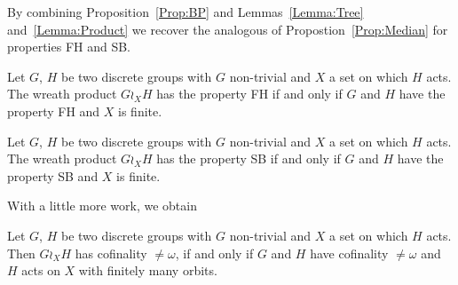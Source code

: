 By combining Proposition~\ref{Prop:BP} and Lemmas~\ref{Lemma:Tree} and~\ref{Lemma:Product} we recover the analogous of Propostion~\ref{Prop:Median} for properties FH and SB.
\begin{prop}
Let $G$, $H$ be two discrete groups with $G$ non-trivial and $X$ a set on which $H$ acts. The wreath product $G \wr_X H$ has the property FH if and only if $G$ and $H$ have the property FH and $X$ is finite.
\end{prop}
%
\begin{prop}
Let $G$, $H$ be two discrete groups with $G$ non-trivial and $X$ a set on which $H$ acts. The wreath product $G \wr_X H$ has the property SB if and only if $G$ and $H$ have the property SB and $X$ is finite.
\end{prop}
%
%
With a little more work, we obtain
\begin{thm}\label{Thm:Cof}
Let $G$, $H$ be two discrete groups with $G$ non-trivial and $X$ a set on which $H$ acts.
Then $G\wr_X H$ has cofinality $\neq\omega$, if and only if $G$ and $H$ have cofinality $\neq\omega$ and $H$ acts on $X$ with finitely many orbits.
\end{thm}

